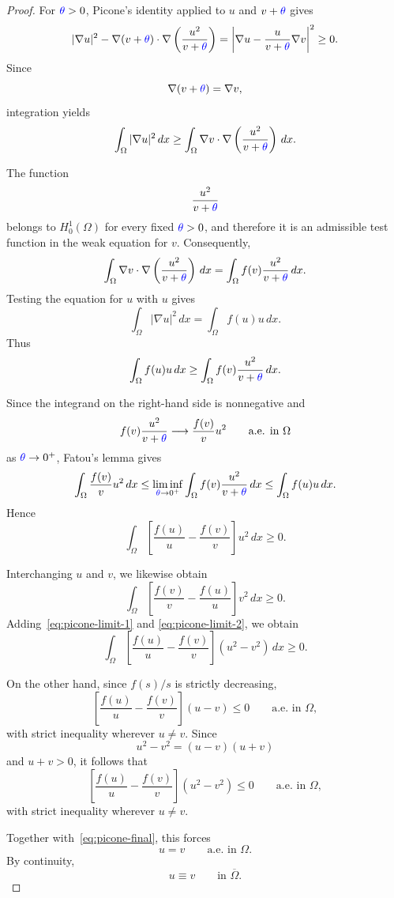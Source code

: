 \documentclass[11pt]{article}
\newcommand{\add}[1]{{\color{blue}#1}}
\theoremstyle{definition}
\begin{document}
\begin{proof}
For $\add{\theta}>0$, Picone's identity applied to $u$ and
$v+\add{\theta}$ gives
\[
|\nabla u|^2
-
\nabla(v+\add{\theta})\cdot
\nabla\left(\frac{u^2}{v+\add{\theta}}\right)
=
\left|
\nabla u-
\frac{u}{v+\add{\theta}}\nabla v
\right|^2
\geq0.
\]
Since
\[
\nabla(v+\add{\theta})=\nabla v,
\]
integration yields
\begin{equation}
\label{eq:picone-eps-1}
\int_\Omega |\nabla u|^2\,dx
\geq
\int_\Omega
\nabla v\cdot
\nabla\left(\frac{u^2}{v+\add{\theta}}\right)\,dx.
\end{equation}

The function
\[
\frac{u^2}{v+\add{\theta}}
\]
belongs to $H_0^1(\Omega)$ for every fixed $\add{\theta}>0$, and
therefore it is an admissible test function in the weak equation for
$v$. Consequently,
\[
\int_\Omega
\nabla v\cdot
\nabla\left(\frac{u^2}{v+\add{\theta}}\right)\,dx
=
\int_\Omega
f(v)\frac{u^2}{v+\add{\theta}}\,dx.
\]
Testing the equation for $u$ with $u$ gives
\[
\int_\Omega|\nabla u|^2\,dx
=
\int_\Omega f(u)u\,dx.
\]
Thus
\begin{equation}
\label{eq:picone-eps-2}
\int_\Omega f(u)u\,dx
\geq
\int_\Omega
f(v)\frac{u^2}{v+\add{\theta}}\,dx.
\end{equation}

Since the integrand on the right-hand side is nonnegative and
\[
f(v)\frac{u^2}{v+\add{\theta}}
\longrightarrow
\frac{f(v)}{v}u^2
\qquad\text{a.e. in }\Omega
\]
as $\add{\theta}\to0^+$, Fatou's lemma gives
\[
\int_\Omega
\frac{f(v)}{v}u^2\,dx
\leq
\liminf_{\add{\theta}\to0^+}
\int_\Omega
f(v)\frac{u^2}{v+\add{\theta}}\,dx
\leq
\int_\Omega f(u)u\,dx.
\]
Hence
\begin{equation}
\label{eq:picone-limit-1}
\int_\Omega
\left[
\frac{f(u)}{u}
-
\frac{f(v)}{v}
\right]u^2\,dx
\geq0.
\end{equation}

Interchanging $u$ and $v$, we likewise obtain
\begin{equation}
\label{eq:picone-limit-2}
\int_\Omega
\left[
\frac{f(v)}{v}
-
\frac{f(u)}{u}
\right]v^2\,dx
\geq0.
\end{equation}
Adding~\eqref{eq:picone-limit-1} and
\eqref{eq:picone-limit-2}, we obtain
\begin{equation}
\label{eq:picone-final}
\int_\Omega
\left[
\frac{f(u)}{u}
-
\frac{f(v)}{v}
\right]
(u^2-v^2)\,dx
\geq0.
\end{equation}

On the other hand, since $f(s)/s$ is strictly decreasing,
\[
\left[
\frac{f(u)}{u}
-
\frac{f(v)}{v}
\right](u-v)\leq0
\qquad\text{a.e. in }\Omega,
\]
with strict inequality wherever $u\neq v$. Since
\[
u^2-v^2=(u-v)(u+v)
\]
and $u+v>0$, it follows that
\[
\left[
\frac{f(u)}{u}
-
\frac{f(v)}{v}
\right]
(u^2-v^2)
\leq0
\qquad\text{a.e. in }\Omega,
\]
with strict inequality wherever $u\neq v$.

Together with~\eqref{eq:picone-final}, this forces
\[
u=v
\qquad\text{a.e. in }\Omega.
\]
By continuity,
\[
u\equiv v
\qquad\text{in }\overline\Omega.
\]
\end{proof}
\end{document}
